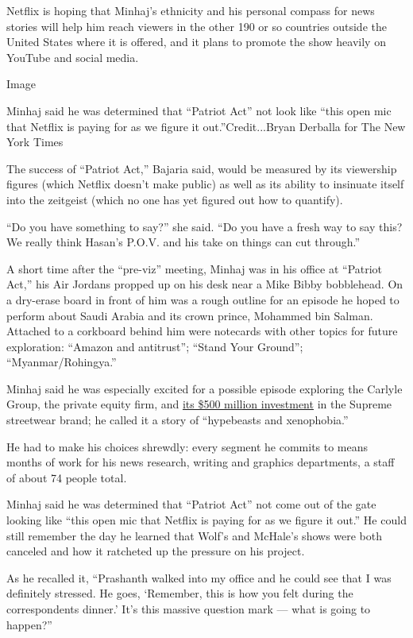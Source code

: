 Netflix is hoping that Minhaj's ethnicity and his personal compass for
news stories will help him reach viewers in the other 190 or so
countries outside the United States where it is offered, and it plans to
promote the show heavily on YouTube and social media.

Image

Minhaj said he was determined that ``Patriot Act'' not look like ``this
open mic that Netflix is paying for as we figure it out.''Credit...Bryan
Derballa for The New York Times

The success of ``Patriot Act,'' Bajaria said, would be measured by its
viewership figures (which Netflix doesn't make public) as well as its
ability to insinuate itself into the zeitgeist (which no one has yet
figured out how to quantify).

``Do you have something to say?'' she said. ``Do you have a fresh way to
say this? We really think Hasan's P.O.V. and his take on things can cut
through.''

A short time after the ``pre-viz'' meeting, Minhaj was in his office at
``Patriot Act,'' his Air Jordans propped up on his desk near a Mike
Bibby bobblehead. On a dry-erase board in front of him was a rough
outline for an episode he hoped to perform about Saudi Arabia and its
crown prince, Mohammed bin Salman. Attached to a corkboard behind him
were notecards with other topics for future exploration: ``Amazon and
antitrust''; ``Stand Your Ground''; ``Myanmar/Rohingya.''

Minhaj said he was especially excited for a possible episode exploring
the Carlyle Group, the private equity firm, and
\href{https://wwd.com/business-news/financial/carlyle-rumored-to-buy-supreme-stake-louis-vuitton-james-jebbia-11022057/}{its
\$500 million investment} in the Supreme streetwear brand; he called it
a story of ``hypebeasts and xenophobia.''

He had to make his choices shrewdly: every segment he commits to means
months of work for his news research, writing and graphics departments,
a staff of about 74 people total.

Minhaj said he was determined that ``Patriot Act'' not come out of the
gate looking like ``this open mic that Netflix is paying for as we
figure it out.'' He could still remember the day he learned that Wolf's
and McHale's shows were both canceled and how it ratcheted up the
pressure on his project.

As he recalled it, ``Prashanth walked into my office and he could see
that I was definitely stressed. He goes, `Remember, this is how you felt
during the correspondents dinner.' It's this massive question mark ---
what is going to happen?''

